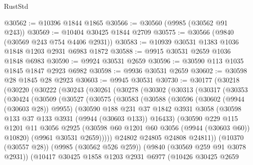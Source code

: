\begin{lexlean}{RustStd}
\begin{coremodule}
@30562 := @10396 @1844 @1865
@30566 := @30560 (@9985 (@30562 @91 @243))
@30569 := @10404 @30425 @1844 @2709
@30575 := @30566 (@9840 (@30569 @243 @754 @4406 @2931))
@30583 := @10939 @30531 @1383 @1036 @1848 @1203 @2931 @6983 @1872
@30588 := @9915 @30531 @2659 @1036 @1848 @6983
@30590 := @9924 @30531 @2659
@30596 := @30590 @113 @1035 @1845 @1847 @2923 @6982
@30598 := @9936 @30531 @2659
@30602 := @30598 @28 @1845 @28 @2923
@30603 := @9945 @30531
@30730 := @30177
    (@30218
      (@30220
        (@30222
          (@30243
            (@30261
              (@30278
                (@30302
                  (@30313
                    (@30317
                      (@30353
                        (@30424
                          (@30509
                            (@30527
                              (@30575
                                (@30583
                                  (@30588
                                    (@30596
                                      (@30602 (@9944 (@30603 @28)) @9955)
                                      (@30590
                                        @188
                                        @231
                                        @37
                                        @1842
                                        @3931
                                        @3058
                                        (@30598 @133 @37 @133 @3931 (@9944 (@30603 @133)) @16433)
                                        (@30590
                                          @229
                                          @115
                                          @1201
                                          @11
                                          @3056
                                          @2925
                                          (@30598 @60 @1201 @60 @3056 (@9944 (@30603 @60)) @10820)
                                          (@9961 @30531 @2659)))))
                                  @24802
                                  @24805
                                  @24808
                                  @24811))
                              (@10370 (@30557 @28))
                              (@9985 (@30562 @526 @259))
                              (@9840 (@30569 @259 @91 @3078 @2931))
                              (@10417
                                @30425
                                @1858
                                @1203
                                @2931
                                @6977
                                (@10426
                                  @30425
                                  @2659

\end{coremodule}
\end{lexlean}
